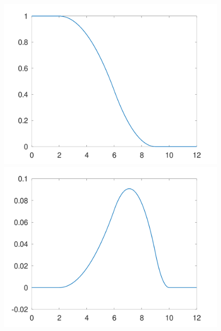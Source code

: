 \documentclass{article}
\begin{document}
\begin{figure}[!htbp]
{\begin{minipage}[b]{.23\linewidth}
    \includegraphics[scale=0.1]{figures/Assignment_G_N2_2_0.png}
    \end{minipage}
    }
    \subfigure
    {
    \begin{minipage}[b]{.23\linewidth}
      \flushleft
    \includegraphics[scale=0.1]{figures/Assignment_G_N2_3_0.png}
    \end{minipage}
    }
    \newline
\end{figure}
\end{document}
